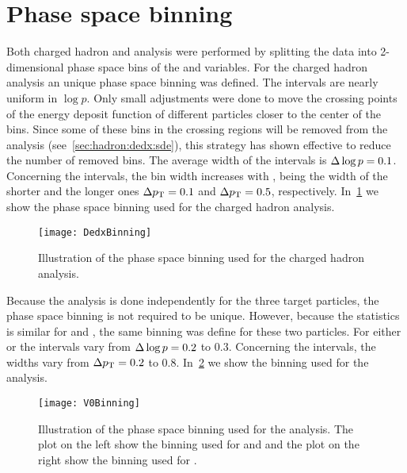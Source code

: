 \section{Phase space binning}
\label{sec:hadron:binning}


Both charged hadron and \vzero analysis were performed
by splitting the data into 2-dimensional phase space bins
of the \pp and \pT variables. For the
charged hadron analysis an unique phase space
binning was defined. The \pp intervals 
are nearly uniform in $\log p$. Only small adjustments
were done to move the crossing points of the energy deposit function
of different particles closer to the center of the bins.
Since some of these bins in the crossing regions
will be removed from the analysis (see~\cref{sec:hadron:dedx:sde}),
this strategy has shown effective to reduce the number of
removed bins. The average width of the \pp intervals is
$\Delta\log p=0.1$. Concerning the \pT intervals, the bin width
increases with \pT, being the width of the shorter and the longer ones
$\Delta p_\text{T}=0.1$ and  $\Delta p_\text{T}=0.5$, respectively.  
In~\cref{fig:hadron:binning:dedx} we show the
phase space binning used for the charged hadron analysis.


\begin{figure}[!ht]
  \centering
  \texttt{[image: DedxBinning]}
  \caption{Illustration of the phase space binning used
    for the charged hadron analysis.}
  \label{fig:hadron:binning:dedx}
\end{figure}

Because the \vzero analysis is done independently for the three target particles,
the phase space binning is not required to be unique.
However, because the statistics is similar for \lamb and \antilamb,
the same binning was define for these two particles.
For either \lambs or \kzeros the \pp intervals vary from
$\Delta\log p=0.2$ to $0.3$. Concerning the \pT intervals,
the widths vary from $\Delta p_\text{T} = 0.2$ to $0.8$.
In~\cref{fig:hadron:binning:vzero} we show the 
binning used for the \vzero analysis.

\begin{figure}[!ht]
  \centering
  \texttt{[image: V0Binning]}
  \caption{Illustration of the phase space binning used
    for the \vzero analysis. The plot on the left show the binning
    used for \lamb and \antilamb and the plot on the right
    show the binning used for \kzeros.}
  \label{fig:hadron:binning:vzero}
\end{figure}


